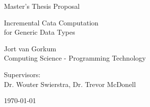 \begin{titlepage}
  \fontsize{12pt}{15pt}\selectfont
  \begin{center}
    \vspace*{4cm}

    Master's Thesis Proposal

    \vspace{0.5cm}

    {
      \fontsize{20.74pt}{20.74pt}\selectfont
      \parbox[]{13cm} {
        \centering
        Incremental Cata Computation \\ for Generic Data Types
      }
    }
      
    \vspace{1.25cm}
    
    Jort van Gorkum\\
    Computing Science - Programming Technology\\
    
    \vspace{1.25cm}
    
    Supervisors: \\
    Dr. Wouter Swierstra, Dr. Trevor McDonell\\
    
    \vspace{1cm}

    \today
  \end{center}
\end{titlepage}